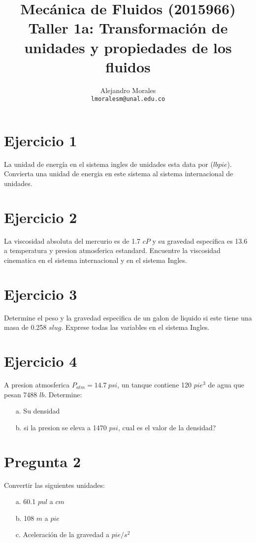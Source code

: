 \documentclass[11pt, oneside]{article}   	%
\title{\vspace{-3cm} Mec\'anica de Fluidos (2015966)\\Taller 1a: Transformaci\'on de unidades y propiedades de los fluidos \vspace{-0.7cm}}
\author{Alejandro Morales \\ \texttt{lmoralesm@unal.edu.co}}
\date{}							%
\begin{document}
\maketitle

\vspace{-1.1cm}
\section*{Ejercicio 1}\vspace{-0.3cm}
La unidad de energ\'ia en el sistema ingles de unidades esta data por ($lb pie$). Convierta una unidad de energia en este sistema al sistema internacional de unidades.


\section*{Ejercicio 2}\vspace{-0.3cm}
La viscosidad absoluta del mercurio es de 1.7 $cP$ y su gravedad especifica es 13.6 a temperatura y presion atmosferica estandard. Encuentre la viscosidad cinematica en el sistema internacional y en el sistema Ingles.


\section*{Ejercicio 3}\vspace{-0.3cm}
Determine el peso y la gravedad especifica de un galon de liquido si este tiene una masa de 0.258 $slug$. Exprese todas las variables en el sistema Ingles.

\section*{Ejercicio 4}\vspace{-0.3cm}
A presion atmosferica $P_{atm}=14.7\ psi$, un tanque contiene 120 $pie^3$ de agua que pesan 7488 $lb$. Determine:
\begin{itemize}
\item[a.] Su densidad
\item[b.] si la presion se eleva a 1470 $psi$, cual es el valor de la densidad?
\end{itemize}
	

\section*{Pregunta 2}\vspace{-0.3cm}
Convertir las siguientes unidades:
\begin{itemize}
\item[a.] 60.1 $pul$ a $cm$ 
\item[b.] 108 $m$ a $pie$
\item[c.] Aceleraci\'on de la gravedad a $pie/s^2$
\end{itemize}
	
\end{document}
